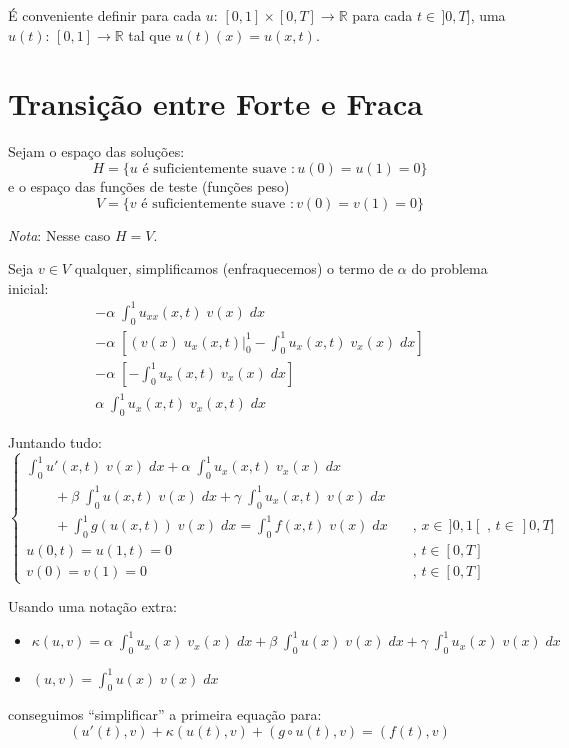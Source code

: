 \documentclass[a4paper]{article}
\newcommand{\typ}{:\,}
\begin{document}
É conveniente definir
para cada \(u \typ [0, 1] \times [0, T] \to \mathbb{R}\)
para cada \(t \in \,]0, T]\),
uma \(u(t) \typ [0, 1] \to \mathbb{R}\)
tal que
\(
    u(t)(x) = u(x, t)
\).

\section{Transição entre Forte e Fraca}

Sejam o espaço das soluções:
\[
    H = \{
        u \text{ é suficientemente suave } : u(0) = u(1) = 0
    \}
\]
e o espaço das funções de teste (funções peso)
\[
    V = \{
        v \text{ é suficientemente suave } : v(0) = v(1) = 0
    \}
\]

\emph{Nota}: Nesse caso \(H = V\).

Seja \(v \in V\) qualquer,
simplificamos (enfraquecemos)
o termo de \(\alpha\)
do problema inicial:
\[ \begin{array}{l}
    - \alpha \; \int_0^1{ u_{xx}(x, t) \; v(x) \; dx }
    \\[1ex]
    - \alpha \; \left[ \left( v(x) \; u_x(x, t) \right|_0^1 - \int_0^1{ u_x(x, t) \; v_x(x) \; dx } \right]
    \\[1ex]
    - \alpha \; \left[ - \int_0^1{ u_x(x, t) \; v_x(x) \; dx } \right]
    \\[1ex]
    \alpha \; \int_0^1{ u_x(x, t) \; v_x(x, t) \; dx }
\end{array} \]

Juntando tudo:
\[ \begin{cases}
    \int_0^1{ u'(x, t) \; v(x) \; dx}
    + \alpha \; \int_0^1{ u_x(x, t) \; v_x(x) \; dx}
    \\\qquad
    + \beta \; \int_0^1{ u(x, t) \; v(x) \; dx}
    + \gamma \; \int_0^1{ u_x(x, t) \; v(x) \; dx}
    \\\qquad
    + \int_0^1{ g(u(x, t)) \; v(x) \; dx}
    = \int_0^1{ f(x, t) \; v(x) \; dx}
        &\quad\text{, } x \in \,]0, 1[ \text{ , } t \in \,]0, T]
    \\
    u(0, t) = u(1, t) = 0
        &\quad\text{, } t \in [0, T]
    \\
    v(0) = v(1) = 0
        &\quad\text{, } t \in [0, T]
\end{cases} \]

Usando uma notação extra:
\begin{itemize}
\item \(
    \kappa(u, v) =
    \alpha \; \int_0^1{ u_x(x) \; v_x(x) \; dx }
    + \beta \; \int_0^1{ u(x) \; v(x) \; dx }
    + \gamma \; \int_0^1{ u_x(x) \; v(x) \; dx}
\)
\item \(
    (u, v) =
    \int_0^1{ u(x) \; v(x) \; dx }
\)
\end{itemize}
conseguimos ``simplificar'' a primeira equação para:
\[
    (u'(t), v)
    + \kappa(u(t), v)
    + (g \circ u(t), v)
    = (f(t), v)
\]
\end{document}
